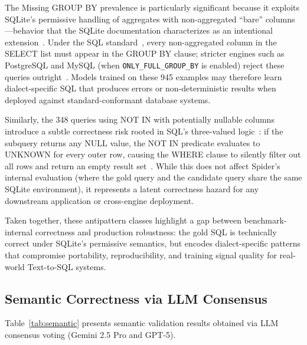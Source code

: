 \documentclass[print]{einformatica}
\begin{document}
The Missing GROUP BY prevalence is particularly significant because it exploits SQLite's permissive handling of aggregates with non-aggregated ``bare'' columns---behavior that the SQLite documentation characterizes as an intentional extension~\cite{sqliteBareColumns}. Under the SQL standard~\cite{iso9075_2_2016}, every non-aggregated column in the SELECT list must appear in the GROUP BY clause; stricter engines such as PostgreSQL and MySQL (when \texttt{ONLY\_FULL\_GROUP\_BY} is enabled) reject these queries outright~\cite{postgresGroupBy,mysqlGroupByHandling}. Models trained on these 945 examples may therefore learn dialect-specific SQL that produces errors or non-deterministic results when deployed against standard-conformant database systems.

Similarly, the 348 queries using NOT IN with potentially nullable columns introduce a subtle correctness risk rooted in SQL's three-valued logic~\cite{iso9075_2_2016}: if the subquery returns any NULL value, the NOT IN predicate evaluates to UNKNOWN for every outer row, causing the WHERE clause to silently filter out all rows and return an empty result set~\cite{karwin2010sqlantipatterns,date2012sqlrelational}. While this does not affect Spider's internal evaluation (where the gold query and the candidate query share the same SQLite environment), it represents a latent correctness hazard for any downstream application or cross-engine deployment.

Taken together, these antipattern classes highlight a gap between benchmark-internal correctness and production robustness: the gold SQL is technically correct under SQLite's permissive semantics, but encodes dialect-specific patterns that compromise portability, reproducibility, and training signal quality for real-world Text-to-SQL systems.

\subsection{Semantic Correctness via LLM Consensus}\label{sec:semantic_results}

Table~\ref{tab:semantic} presents semantic validation results obtained via LLM consensus voting (Gemini 2.5 Pro and GPT-5).
\end{document}
